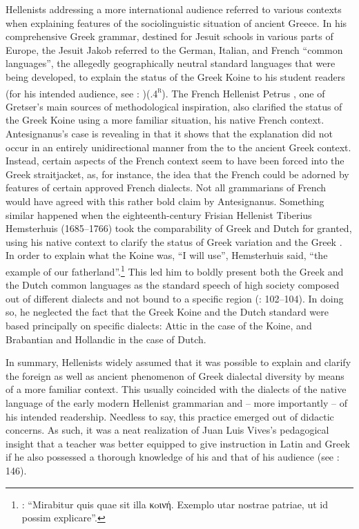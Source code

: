 Hellenists addressing a more international audience referred to various  contexts when explaining features of the sociolinguistic situation of ancient Greece. In his comprehensive Greek grammar, destined for Jesuit schools in various parts of Europe, the Jesuit Jakob \citet[20]{Gretser1593} referred to the German, Italian, and French “common languages”, the allegedly geographically neutral standard languages that were being developed, to explain the status of the Greek Koine to his student readers (for his intended audience, see \citealt{Gretser1593}: {\footnotesize{)(}}.4\textsc{\textsuperscript{r}}). The French Hellenist Petrus \citet[11--12]{Antesignanus1554}, one of Gretser’s main sources of methodological inspiration, also clarified the status of the Greek Koine using a more familiar situation, his native French context. Antesignanus’s case is revealing in that it shows that the explanation did not occur in an entirely unidirectional manner from the  to the ancient Greek context. Instead, certain aspects of the French context seem to have been forced into the Greek straitjacket, as, for instance, the idea that the French  could be adorned by features of certain approved French dialects. Not all grammarians of French would have agreed with this rather bold claim by Antesignanus. Something similar happened when the eighteenth-century Frisian Hellenist Tiberius Hemsterhuis (1685–1766) took the comparability of Greek and Dutch for granted, using his native context to clarify the status of Greek variation and the Greek . In order to explain what the Koine was, “I will use”, Hemsterhuis said, “the example of our fatherland”.\footnote{\citet[102]{Hemsterhuis2015}: “Mirabitur quis quae sit illa κoινή. Exemplo utar nostrae patriae, ut id possim explicare”.} This led him to boldly present both the Greek and the Dutch common languages as the standard speech of high society composed out of different dialects and not bound to a specific region (\citealt{Hemsterhuis2015}: 102–104). In doing so, he neglected the fact that the Greek Koine and the Dutch standard were based principally on specific dialects: Attic in the case of the Koine, and Brabantian and Hollandic in the case of Dutch.

In summary, Hellenists widely assumed that it was possible to explain and clarify the foreign as well as ancient phenomenon of Greek dialectal diversity by means of a more familiar context. This usually coincided with the dialects of the native language of the early modern Hellenist grammarian and – more importantly – of his intended readership. Needless to say, this practice emerged out of didactic concerns. As such, it was a neat realization of Juan Luis Vives’s pedagogical insight that a teacher was better equipped to give instruction in Latin and Greek if he also possessed a thorough knowledge of his  and that of his audience (see \citealt{Padley1985}: 146).

